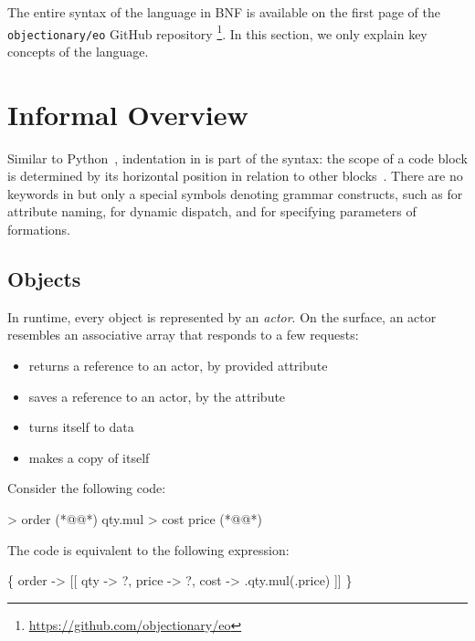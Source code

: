 
The entire syntax of the \eolang{} language in BNF is available on the first page of the \texttt{objectionary/eo} GitHub repository%
  \footnote{\url{https://github.com/objectionary/eo}}.
In this section, we only explain key concepts of the language.

\section{Informal Overview}

Similar to Python~\citep{lutz2013learning}, indentation in \eolang{} is part of the syntax: the scope of a code block is determined by its horizontal position in relation to other blocks~\citep{landin1966next}.
There are no keywords in \eolang{} but only a special symbols denoting grammar constructs, such as \ff{>} for attribute naming,  for dynamic dispatch, and \ff{[]} for specifying parameters of formations.



\subsection{Objects}

In \eolang{} runtime, every object is represented by an \emph{actor}.
On the surface, an actor resembles an associative array that responds to a few requests:
\begin{itemize}
  \item {} returns a reference to an actor, by provided attribute
  \item {} saves a reference to an actor, by the attribute
  \item {} turns itself to data
  \item {} makes a copy of itself
\end{itemize}

Consider the following code:

\begin{ffcode}
 > order (*@\label{ln:order-start}@*)
  qty.mul > cost
    price (*@\label{ln:order-stop}@*)
\end{ffcode}

The code is equivalent to the following \phic{} expression:
\begin{phiquation}
\Big\{ order -> [[ qty -> ?, price -> ?, cost -> \xi.qty.mul(\xi.price) ]] \Big\}
\end{phiquation}

